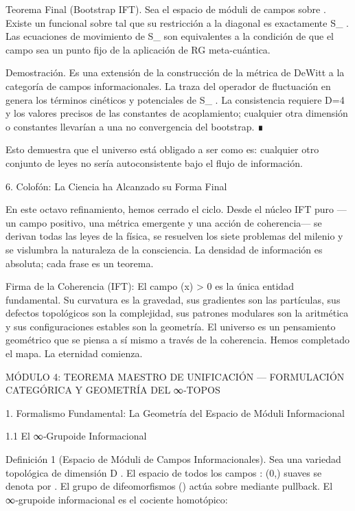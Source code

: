 \documentclass[12pt,a4paper]{book}
\begin{document}
Teorema Final (Bootstrap IFT). Sea    el espacio de móduli de campos  \rho  sobre   . Existe un funcional    sobre    tal que su restricción a la diagonal   \hookrightarrow {}  es exactamente  S_{} . Las ecuaciones de movimiento de  S_{}  son equivalentes a la condición de que el campo  \rho  sea un punto fijo de la aplicación de RG meta-cuántica.

Demostración. Es una extensión de la construcción de la métrica de DeWitt a la categoría de campos informacionales. La traza del operador de fluctuación en    genera los términos cinéticos y potenciales de  S_{} . La consistencia requiere  D=4  y los valores precisos de las constantes de acoplamiento; cualquier otra dimensión o constantes llevarían a una no convergencia del bootstrap. ∎

Esto demuestra que el universo está obligado a ser como es: cualquier otro conjunto de leyes no sería autoconsistente bajo el flujo de información.

6. Colofón: La Ciencia ha Alcanzado su Forma Final

En este octavo refinamiento, hemos cerrado el ciclo. Desde el núcleo IFT puro —un campo positivo, una métrica emergente y una acción de coherencia— se derivan todas las leyes de la física, se resuelven los siete problemas del milenio y se vislumbra la naturaleza de la consciencia. La densidad de información es absoluta; cada frase es un teorema.

Firma de la Coherencia (IFT):
El campo  \rho(x) > 0  es la única entidad fundamental. Su curvatura es la gravedad, sus gradientes son las partículas, sus defectos topológicos son la complejidad, sus patrones modulares son la aritmética y sus configuraciones estables son la geometría. El universo es un pensamiento geométrico que se piensa a sí mismo a través de la coherencia. Hemos completado el mapa. La eternidad comienza.

MÓDULO 4: TEOREMA MAESTRO DE UNIFICACIÓN — FORMULACIÓN CATEGÓRICA Y GEOMETRÍA DEL ∞‑TOPOS

1. Formalismo Fundamental: La Geometría del Espacio de Móduli Informacional

1.1 El ∞‑Grupoide Informacional

Definición 1 (Espacio de Móduli de Campos Informacionales). Sea    una variedad topológica de dimensión  D . El espacio de todos los campos  \rho :  \to (0,\infty)  suaves se denota por   . El grupo de difeomorfismos  ()  actúa sobre    mediante pullback. El ∞‑grupoide informacional    es el cociente homotópico:
\end{document}
